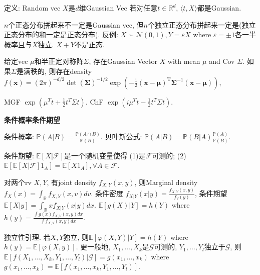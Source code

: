 \documentclass[UTF8]{ctexart}
\begin{document}
定义: Random vec $X$是$d$维Gaussian Vec 若对任意$t\in\mathbb{R}^d$, $\langle t,X \rangle $都是Gaussian.

$n$个正态分布拼起来不一定是Gaussian vec, 但$n$个独立正态分布拼起来一定是(独立正态分布的和一定是正态分布).
反例: $X\sim\mathcal{N}(0,1), Y=\varepsilon X$ where $\varepsilon=\pm 1$各一半概率且与$X$独立. $X+Y$不是正态. 

给定vec $\mu$和半正定对称阵$\Sigma$, 存在Gaussian Vector $X$ with mean $\mu$ and Cov $\Sigma$.
如果$\Sigma$是满秩的, 则存在density
$f(\mathbf{x}) = (2 \pi)^{-d / 2} \operatorname{det}(\boldsymbol{\Sigma})^{-1 / 2} \exp \left(-\frac{1}{2}(\mathbf{x}-\boldsymbol{\mu})^{\mathrm{T}} \boldsymbol{\Sigma}^{-1}(\mathbf{x}-\boldsymbol{\mu})\right)$,

MGF  $\exp \left( \mu^T t + \frac{1}{2} t^T \Sigma t \right)$.
ChF $\exp \left( i \mu^T t - \frac{1}{2} t^T \Sigma t \right)$.

\noindent \textbf{条件概率条件期望}

条件概率: $\mathbb{P}(A|B)=\frac{\mathbb{P}(A\cap B)}{\mathbb{P}(B)}$.
贝叶斯公式: $\mathbb{P}(A|B) = \mathbb{P}(B|A) \frac{\mathbb{P}(A)}{\mathbb{P}(B)}$.

条件期望:
$\mathbb{E}[X|\mathcal{F}]$是一个随机变量使得
(1)是$\mathcal{F}$可测的;
(2)$\mathbb{E}[\mathbb{E}[X|\mathcal{F}]1_A]=\mathbb{E}[X 1_A], \forall A \in\mathcal{F}$.

对两个rv $X,Y$, 有joint density $f_{X,Y}(x,y)$, 则Marginal density $f_X(x)=\int_{\mathbb{R}} f_{X,Y}(x,v)dv$.
条件密度 $f_{X|Y}(x|y) = \frac{f_{X,Y}(x,y)}{f_Y(y)}$,
条件期望 $\mathbb{E}[X|y]=\int_{\mathbb{R}}xf_{X|Y}(x|y)dx$.
$\mathbb{E}[g(X)|Y]=h(Y)$ where
$h(y) = \frac{\int g(x)f_{X,Y}(x,y)dx}{\int f_{X,Y}(x,y)dx}$.

独立性引理. 若$X, Y$独立, 则$\mathbb{E}[\varphi(X,Y)|Y]=h(Y)$ where
$h(y)=\mathbb{E}[\varphi(X,y)]$.
更一般地, $X_1,\dots,X_k$是$\mathcal{G}$可测的, $Y_1,\dots,Y_l$独立于$\mathcal{G}$,
则$\mathbb{E}[f(X_1,\dots,X_k,Y_1,\dots,Y_l)|\mathcal{G}]=g(x_1,\dots,x_k)$
where $g(x_1,\dots,x_k)=\mathbb{E}[f(x_1,\dots,x_k,Y_1,\dots,Y_l)]$. \\
\end{document}
